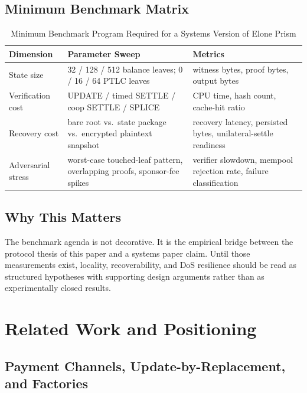 \documentclass[11pt,a4paper]{article}
\begin{document}
\subsection{Minimum Benchmark Matrix}

\begin{table}[htbp]
\centering
\caption{Minimum Benchmark Program Required for a Systems Version of Elone Prism}
\label{tab:evaluation_matrix}
\small
\begin{tabularx}{\linewidth}{@{}l X X@{}}
\toprule
\textbf{Dimension} & \textbf{Parameter Sweep} & \textbf{Metrics} \\
\midrule
State size & 32 / 128 / 512 balance leaves; 0 / 16 / 64 PTLC leaves & witness bytes, proof bytes, output bytes \\
Verification cost & UPDATE / timed SETTLE / coop SETTLE / SPLICE & CPU time, hash count, cache-hit ratio \\
Recovery cost & bare root vs.\ state package vs.\ encrypted plaintext snapshot & recovery latency, persisted bytes, unilateral-settle readiness \\
Adversarial stress & worst-case touched-leaf pattern, overlapping proofs, sponsor-fee spikes & verifier slowdown, mempool rejection rate, failure classification \\
\bottomrule
\end{tabularx}
\end{table}

\subsection{Why This Matters}

The benchmark agenda is not decorative. It is the empirical bridge between the protocol thesis of this paper and a systems paper claim. Until those measurements exist, locality, recoverability, and DoS resilience should be read as structured hypotheses with supporting design arguments rather than as experimentally closed results.

\section{Related Work and Positioning}

\subsection{Payment Channels, Update-by-Replacement, and Factories}
\end{document}
